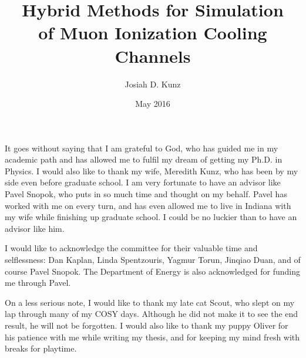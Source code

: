 \title{Hybrid Methods for Simulation\\
of Muon Ionization Cooling Channels}
\author{Josiah D. Kunz}
\date{May 2016}
\copyrightnoticefalse      %
\maketitle                %


\prelimpages         %


\begin{acknowledgement}

It goes without saying that I am grateful to God, who has guided me in my academic path and has allowed me to fulfil my dream of getting my Ph.D. in Physics. I would also like to thank my wife, Meredith Kunz, who has been by my side even before graduate school. I am very fortunate to have an advisor like Pavel Snopok, who puts in so much time and thought on my behalf. Pavel has worked with me on every turn, and has even allowed me to live in Indiana with my wife while finishing up graduate school. I could be no luckier than to have an advisor like him. 

I would like to acknowledge the committee for their valuable time and selflessness: Dan Kaplan, Linda Spentzouris, Yagmur Torun, Jinqiao Duan, and of course Pavel Snopok. The Department of Energy is also acknowledged for funding me through Pavel.

On a less serious note, I would like to thank my late cat Scout, who slept on my lap through many of my COSY days. Although he did not make it to see the end result, he will not be forgotten. I would also like to thank my puppy Oliver for his patience with me while writing my thesis, and for keeping my mind fresh with breaks for playtime.

\end{acknowledgement}


\tableofcontents
\clearpage

\listoftables

\clearpage

\listoffigures

\clearpage